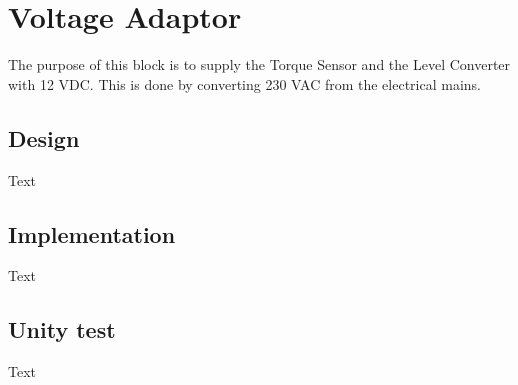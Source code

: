 \section{Voltage Adaptor}
The purpose of this block is to supply the Torque Sensor and the Level Converter with 12 VDC. This is done by converting 230 VAC from the electrical mains.

\subsection{Design}
Text

\subsection{Implementation}
Text

\subsection{Unity test}
Text